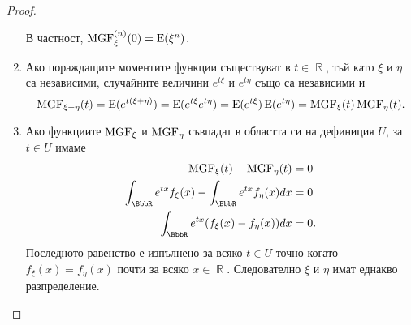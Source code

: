\documentclass{../../common/topic}
\begin{document}
\begin{proof}
\begin{enumerate}
    В частност, \( \operatorname{MGF}^{(n)}_\xi(0) = \operatorname{E}(\xi^n) \).

    \item Ако пораждащите моментите функции съществуват в \( t \in \BbbR \), тъй като \( \xi \) и \( \eta \) са независими, случайните величини \( e^{t\xi} \) и \( e^{t\eta} \) също са независими и
    \begin{equation*}
      \operatorname{MGF}_{\xi + \eta}(t)
      =
      \operatorname{E}(e^{t(\xi + \eta)})
      =
      \operatorname{E}(e^{t\xi} e^{t\eta})
      =
      \operatorname{E}(e^{t\xi}) \operatorname{E}(e^{t\eta})
      =
      \operatorname{MGF}_\xi(t) \operatorname{MGF}_\eta(t).
    \end{equation*}

    \item Ако функциите \( \operatorname{MGF}_\xi \) и \( \operatorname{MGF}_\eta \) съвпадат в областта си на дефиниция \( U \), за \( t \in U \) имаме
    \begin{align*}
      \MGF_\xi(t) - \MGF_\eta(t) &= 0
      \\
      \int_{\BbbR} e^{tx} f_\xi(x) - \int_{\BbbR} e^{tx} f_\eta(x) dx &= 0
      \\
      \int_{\BbbR} e^{tx} (f_\xi(x) - f_\eta(x)) dx &= 0.
    \end{align*}
    Последното равенство е изпълнено за всяко \( t \in U \) точно когато \( f_\xi(x) = f_\eta(x) \) почти за всяко \( x \in \BbbR \). Следователно \( \xi \) и \( \eta \) имат еднакво разпределение.
  \end{enumerate}
\end{proof}
\end{document}
